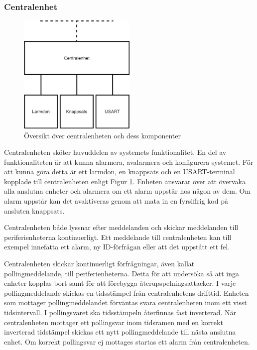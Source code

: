 \documentclass[a4paper]{article}
\begin{document}
\subsubsection{Centralenhet}
\begin{figure}[H]
    \centering
    \includegraphics[width=0.5\textwidth]{central-oversikt-pp.png}
    \caption{Översikt över centralenheten och dess komponenter}
    \label{fig:oversiktcentral}
\end{figure}

Centralenheten sköter huvuddelen av systemets funktionalitet.
En del av funktionaliteten är att kunna alarmera, avalarmera och konfigurera systemet.
För att kunna göra detta är ett larmdon, en knappsats och en USART-terminal kopplade till centralenheten enligt Figur \ref{fig:oversiktcentral}.
Enheten ansvarar över att övervaka alla anslutna enheter och alarmera om ett alarm uppstår hos någon av dem.
Om alarm uppstår kan det avaktiveras genom att mata in en fyrsiffrig kod på ansluten knappsats.

Centralenheten både lyssnar efter meddelanden och skickar meddelanden till periferienheterna kontinuerligt.
Ett meddelande till centralenheten kan till exempel innefatta ett alarm, ny ID-förfrågan eller att det uppstått ett fel.

Centralenheten skickar kontinuerligt förfrågningar, även kallat pollingmeddelande, till periferienheterna.
Detta för att undersöka så att inga enheter kopplas bort samt för att förebygga återupspelningsattacker.
I varje pollingmeddelande skickas en tidsstämpel från centralenhetens drifttid.
Enheten som mottager pollingmeddelandet förväntas svara centralenheten inom ett visst tidsintervall.
I pollingsvaret ska tidsstämpeln återfinnas fast inverterad.
När centralenheten mottager ett pollingsvar inom tidsramen med en korrekt inverterad tidstämpel skickas ett nytt pollingmeddelande till nästa anslutna enhet.
Om korrekt pollingsvar ej mottages startas ett alarm från centralenheten.
\end{document}
